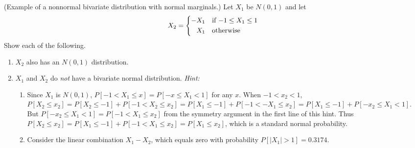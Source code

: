 (Example of a nonnormal bivariate distribution with normal marginals.) Let $X_1$ be $N(0,1)$ and let
\[
  X_2
  =
  \begin{cases*}
    -X_1 & if $-1 \leq X_1 \leq 1$ \\
    \phantom{-}X_1 & otherwise
  \end{cases*}
\]
Show each of the following.
\begin{enumerate}[label= (\alph*)]
    \item $X_2$ also has an $N(0,1)$ distribution.
    \item $X_1$ and $X_2$ do \textit{not} have a bivariate normal distribution.
    \textit{Hint:}
    \begin{enumerate}[label= (\alph*)]
        \item Since $X_1$ is $N(0,1)$, $P[-1 < X_1 \leq x] = P[-x \leq X_1 < 1]$ for any $x$. When $-1 < x_2 < 1$, $P[X_2 \leq x_2] = P[X_2 \leq -1] + P[-1 < X_2 \leq x_2] = P[X_1 \leq -1] + P[-1 < -X_1 \leq x_2] = P[X_1 \leq -1] + P[-x_2 \leq X_1 < 1]$. But $P[-x_2 \leq X_1 < 1] = P[-1 < X_1 \leq x_2]$ from the symmetry argument in the first line of this hint. Thus $P[X_2 \leq x_2] = P[X_1 \leq -1] + P[-1 < X_1 \leq x_2] = P[X_1 \leq x_2]$, which is a standard normal probability.
        \item Consider the linear combination $X_1 - X_2$, which equals zero with probability $P[|X_1| > 1] = 0.3174$.
    \end{enumerate}
\end{enumerate}
